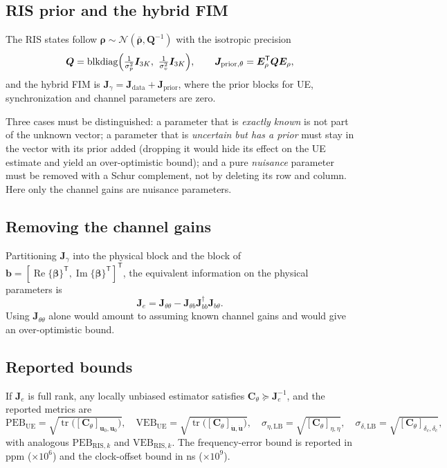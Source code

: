 \documentclass[11pt,a4paper]{article}
\newcommand{\vect}[1]{\bm{#1}}
\newcommand{\T}{\mathsf{T}}
\newcommand{\udot}{\dot{\vect{u}}}
\renewcommand{\Re}{\operatorname{Re}}
\renewcommand{\Im}{\operatorname{Im}}
\DeclareMathOperator{\tr}{tr}
\begin{document}
\subsection{RIS prior and the hybrid FIM}
The RIS states follow $\vect{\rho}\sim\mathcal{N}(\bar{\vect{\rho}},\vect{Q}^{-1})$ with the isotropic precision
\begin{equation}
\vect{Q}=\operatorname{blkdiag}\Bigl(\tfrac{1}{\sigma_p^2}\vect{I}_{3K},\ \tfrac{1}{\sigma_v^2}\vect{I}_{3K}\Bigr),
\qquad \vect{J}_{\mathrm{prior},\theta}=\vect{E}_\rho^{\T}\vect{Q}\vect{E}_\rho,
\end{equation}
and the hybrid FIM is $\vect{J}_\gamma=\vect{J}_{\mathrm{data}}+\vect{J}_{\mathrm{prior}}$, where the prior blocks
for UE, synchronization and channel parameters are zero.

Three cases must be distinguished: a parameter that is \emph{exactly known} is not part of the unknown vector; a
parameter that is \emph{uncertain but has a prior} must stay in the vector with its prior added (dropping it would
hide its effect on the UE estimate and yield an over-optimistic bound); and a pure \emph{nuisance} parameter must
be removed with a Schur complement, not by deleting its row and column. Here only the channel gains are nuisance
parameters.

\subsection{Removing the channel gains}
Partitioning $\vect{J}_\gamma$ into the physical block and the block of $\vect{b}=[\Re\{\vect{\beta}\}^{\T},
\Im\{\vect{\beta}\}^{\T}]^{\T}$, the equivalent information on the physical parameters is
\begin{equation}
\vect{J}_e=\vect{J}_{\theta\theta}-\vect{J}_{\theta b}\vect{J}_{bb}^{\dagger}\vect{J}_{b\theta}.
\end{equation}
Using $\vect{J}_{\theta\theta}$ alone would amount to assuming known channel gains and would give an
over-optimistic bound.

\subsection{Reported bounds}
If $\vect{J}_e$ is full rank, any locally unbiased estimator satisfies $\vect{C}_\theta\succeq\vect{J}_e^{-1}$,
and the reported metrics are
\begin{equation}
\mathrm{PEB}_{\mathrm{UE}}=\sqrt{\tr\bigl([\vect{C}_\theta]_{\vect{u}_0,\vect{u}_0}\bigr)},\quad
\mathrm{VEB}_{\mathrm{UE}}=\sqrt{\tr\bigl([\vect{C}_\theta]_{\udot,\udot}\bigr)},\quad
\sigma_{\eta,\mathrm{LB}}=\sqrt{[\vect{C}_\theta]_{\eta,\eta}},\quad
\sigma_{\delta,\mathrm{LB}}=\sqrt{[\vect{C}_\theta]_{\delta_c,\delta_c}},
\end{equation}
with analogous $\mathrm{PEB}_{\mathrm{RIS},k}$ and $\mathrm{VEB}_{\mathrm{RIS},k}$. The frequency-error bound is
reported in ppm ($\times10^6$) and the clock-offset bound in ns ($\times10^9$).
\end{document}
